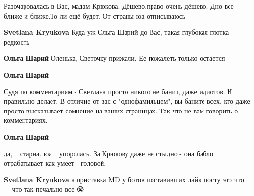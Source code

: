 \begin{itemize}
\begin{itemize}
 
Разочаровалась в Вас, мадам Крюкова. Дёшево,право очень дёшево. Дно все ближе и ближе.То ли ещё будет. От страны юа отписываюсь

 
\textbf{Svetlana Kryukova} Куда уж Ольга Шарий до Вас, такая глубокая глотка - редкость 🤣

 
\textbf{Ольга Шарий} Оленька, Светочку прижали. Ее пожалеть только остается

 
\textbf{Ольга Шарий} 

Судя по комментариям - Светлана просто никого не банит, даже идиотов. И
правильно делает. В отличие от вас с "однофамильцем", вы баните всех, кто даже
просто высказывает сомнение на ваших страницах. Так что не вам говорить о
комментариях.


 
\textbf{Ольга Шарий} 

да, =старна. юа= упоролась. За Крюкову даже не стыдно - она бабло отрабатывает
как умеет - головой.

 
\textbf{Svetlana Kryukova} а приставка MD у ботов поставивших лайк посту это что 🤣🤣🤣🤣🤣 что так печально все 😭🤣


\end{itemize}
\end{itemize}
